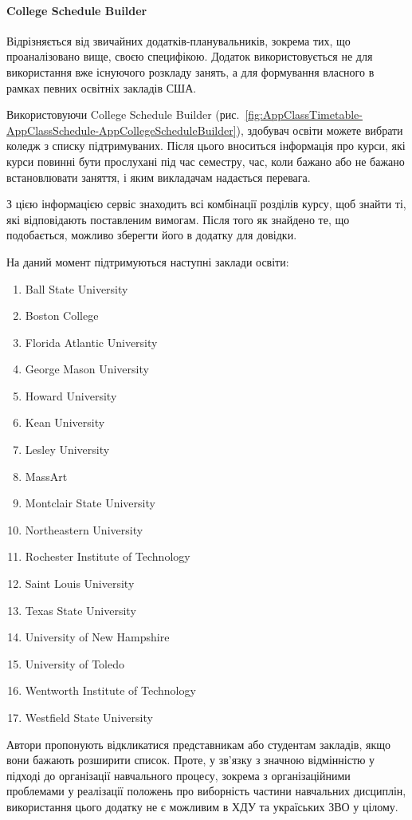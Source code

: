 \paragraph{College Schedule Builder}

Відрізняється від звичайних додатків-планувальників, зокрема тих, що проаналізовано вище, своєю специфікою. Додаток використовується не для використання вже існуючого розкладу занять, а для формування власного в рамках певних освітніх закладів США.

Використовуючи College Schedule Builder (рис.~\ref{fig:AppClassTimetable-AppClassSchedule-AppCollegeScheduleBuilder}), здобувач освіти можете вибрати коледж з списку підтримуваних. Після цього вноситься інформація про курси, які курси повинні бути прослухані під час семестру, час, коли бажано або не бажано встановлювати заняття, і яким викладачам надається перевага.

З цією інформацією сервіс знаходить всі комбінації розділів курсу, щоб знайти ті, які відповідають поставленим вимогам. Після того як знайдено те, що подобається, можливо зберегти його в додатку для довідки.

На даний момент підтримуються наступні заклади освіти:
\begin{enumerate}
    \item Ball State University
	\item Boston College
	\item Florida Atlantic University
	\item George Mason University
	\item Howard University
	\item Kean University
	\item Lesley University
	\item MassArt
	\item Montclair State University
	\item Northeastern University
	\item Rochester Institute of Technology
	\item Saint Louis University
	\item Texas State University
	\item University of New Hampshire
	\item University of Toledo
	\item Wentworth Institute of Technology
	\item Westfield State University
\end{enumerate}

Автори пропонують відкликатися представникам або студентам закладів, якщо вони бажають розширити список. Проте, у зв'язку з значною відмінністю у підході до організації навчального процесу, зокрема з організаційними проблемами у реалізації положень про виборність частини навчальних дисциплін, використання цього додатку не є можливим в ХДУ та україських ЗВО у цілому.
